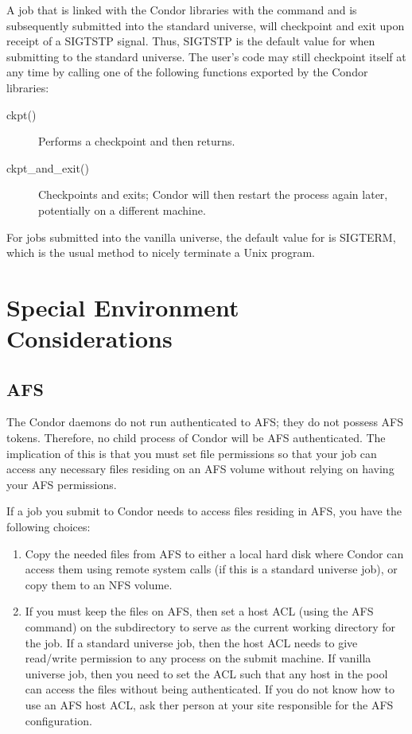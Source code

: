 A job that is linked with the Condor libraries with the 
command
and is subsequently submitted into the standard universe, 
will checkpoint and exit upon receipt of a SIGTSTP signal.
Thus, SIGTSTP is
the default value for  when submitting to the standard
universe.
The user's code may still checkpoint itself at any time
by calling one of the following functions exported by the Condor libraries:
\begin{description}
\item[ckpt()] Performs a checkpoint and then returns.
\item[ckpt\_and\_exit()] Checkpoints and exits; Condor will then
restart the process again later, potentially on a different machine.
\end{description}

For jobs submitted into the vanilla universe, the default value for
 is SIGTERM,
which is the usual method to nicely terminate a Unix program.

\section{Special Environment Considerations}

\subsection{AFS}

The Condor daemons do not run authenticated to AFS; they do not possess
AFS tokens.
Therefore, no child process of Condor will be AFS
authenticated.
The implication of this is
that you must set file permissions so
that your job can access any necessary files residing on an AFS volume
without relying on having your AFS permissions.

If a job you submit to Condor needs to access files residing in AFS,
you have the following choices:
\begin{enumerate}
\item Copy the needed files from AFS to either a local hard disk where Condor 
can access them using remote system calls (if
this is a standard universe job), or copy them to an NFS volume.
\item If you must keep the files on AFS, then set a host ACL
(using the AFS  command) on the subdirectory to
serve as the current working directory for the job.
If a standard universe job, then the host ACL needs
to give read/write permission
to any process on the submit machine.
If vanilla universe job,
then you need to set the ACL such that any host in the pool can
access the files without being authenticated.
If you do not know how to
use an AFS host ACL, ask ther person at your site responsible for the
AFS configuration.
\end{enumerate}

